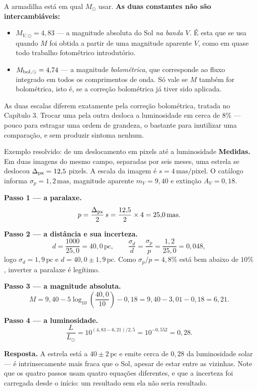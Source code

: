 \documentclass[11pt,a4paper]{article}
\begin{document}
A armadilha está em qual $M_\odot$ usar. \textbf{As duas constantes não são intercambiáveis:}
\begin{itemize}
\item $M_{V,\odot}=4{,}83$ --- a magnitude absoluta do Sol \emph{na banda $V$}. É esta que se usa quando $M$ foi obtida a partir de uma magnitude aparente $V$, como em quase todo trabalho fotométrico introdutório.
\item $M_{{\rm bol},\odot}=4{,}74$ --- a magnitude \emph{bolométrica}, que corresponde ao fluxo integrado em todos os comprimentos de onda. Só vale se $M$ também for bolométrica, isto é, se a correção bolométrica já tiver sido aplicada.
\end{itemize}

As duas escalas diferem exatamente pela correção bolométrica, tratada no Capítulo 3. Trocar uma pela outra desloca a luminosidade em cerca de $8\%$ --- pouco para estragar uma ordem de grandeza, o bastante para inutilizar uma comparação, e sem produzir sintoma nenhum.

\begin{lessonblock}[borderline west={2pt}{0pt}{astroGold}]{Exemplo resolvido: de um deslocamento em pixels até a luminosidade}
\textbf{Medidas.} Em duas imagens do mesmo campo, separadas por seis meses, uma estrela se deslocou $\Delta_{\rm px}=12{,}5$ pixels. A escala da imagem é $s=4\,\mathrm{mas/pixel}$. O catálogo informa $\sigma_p=1{,}2\,\mathrm{mas}$, magnitude aparente $m_V=9{,}40$ e extinção $A_V=0{,}18$.

\textbf{Passo 1 --- a paralaxe.}
\[
p=\frac{\Delta_{\rm px}}{2}\,s=\frac{12{,}5}{2}\times4=25{,}0\,\mathrm{mas}.
\]

\textbf{Passo 2 --- a distância e sua incerteza.}
\[
d=\frac{1000}{25{,}0}=40{,}0\,\mathrm{pc},
\qquad
\frac{\sigma_d}{d}=\frac{\sigma_p}{p}=\frac{1{,}2}{25{,}0}=0{,}048 ,
\]
logo $\sigma_d=1{,}9\,\mathrm{pc}$ e $d=40{,}0\pm1{,}9\,\mathrm{pc}$. Como $\sigma_p/p=4{,}8\%$ está bem abaixo de $10\%$, inverter a paralaxe é legítimo.

\textbf{Passo 3 --- a magnitude absoluta.}
\[
M=9{,}40-5\log_{10}\!\left(\frac{40{,}0}{10}\right)-0{,}18
 =9{,}40-3{,}01-0{,}18=6{,}21 .
\]

\textbf{Passo 4 --- a luminosidade.}
\[
\frac{L}{L_\odot}=10^{(4{,}83-6{,}21)/2{,}5}=10^{-0{,}552}=0{,}28 .
\]

\textbf{Resposta.} A estrela está a $40\pm2\,\mathrm{pc}$ e emite cerca de $0{,}28$ da luminosidade solar --- é intrinsecamente mais fraca que o Sol, apesar de estar entre as vizinhas. Note que os quatro passos usam quatro equações diferentes, e que a incerteza foi carregada desde o início: um resultado sem ela não seria resultado.
\end{lessonblock}
\end{document}
